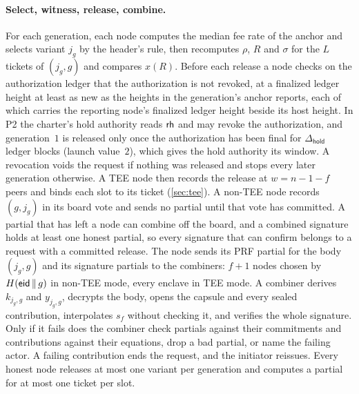 \paragraph{Select, witness, release, combine.} For each generation, each node computes the median fee rate of the anchor and selects variant $j_g$ by the header's rule, then recomputes $\rho$, $R$ and $\sigma$ for the $L$ tickets of $(j_g, g)$ and compares $x(R)$. Before each release a node checks on the authorization ledger that the authorization is not revoked, at a finalized ledger height at least as new as the heights in the generation's anchor reports, each of which carries the reporting node's finalized ledger height beside its host height. In P2 the charter's hold authority reads $\mathsf{rh}$ and may revoke the authorization, and generation~$1$ is released only once the authorization has been final for $\Delta_{\mathsf{hold}}$ ledger blocks (launch value~$2$), which gives the hold authority its window. A revocation voids the request if nothing was released and stops every later generation otherwise. A TEE node then records the release at $w = n - 1 - f$ peers and binds each slot to its ticket (\cref{sec:tee}). A non-TEE node records $(g, j_g)$ in its board vote and sends no partial until that vote has committed. A partial that has left a node can combine off the board, and a combined signature holds at least one honest partial, so every signature that can confirm belongs to a request with a committed release. The node sends its PRF partial for the body $(j_g, g)$ and its signature partials to the combiners: $f+1$ nodes chosen by $H(\mathsf{eid} \,\|\, g)$ in non-TEE mode, every enclave in TEE mode. A combiner derives $k_{j_g,g}$ and $y_{j_g,g}$, decrypts the body, opens the capsule and every sealed contribution, interpolates $s_f$ without checking it, and verifies the whole signature. Only if it fails does the combiner check partials against their commitments and contributions against their equations, drop a bad partial, or name the failing actor. A failing contribution ends the request, and the initiator reissues. Every honest node releases at most one variant per generation and computes a partial for at most one ticket per slot.

